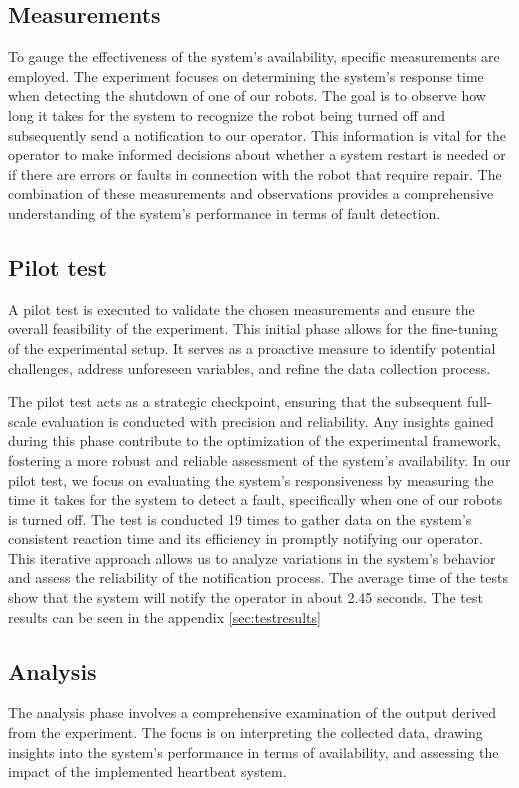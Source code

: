\subsection{Measurements}
\label{sec:measurements}
To gauge the effectiveness of the system's availability, specific measurements are employed. The experiment focuses on determining the system's response time when detecting the shutdown of one of our robots. The goal is to observe how long it takes for the system to recognize the robot being turned off and subsequently send a notification to our operator. This information is vital for the operator to make informed decisions about whether a system restart is needed or if there are errors or faults in connection with the robot that require repair. The combination of these measurements and observations provides a comprehensive understanding of the system's performance in terms of fault detection. 


\subsection{Pilot test}
\label{sec:pilot_test}
A pilot test\cite{Pilot} is executed to validate the chosen measurements and ensure the overall feasibility of the experiment. This initial phase allows for the fine-tuning of the experimental setup. It serves as a proactive measure to identify potential challenges, address unforeseen variables, and refine the data collection process.

The pilot test acts as a strategic checkpoint, ensuring that the subsequent full-scale evaluation is conducted with precision and reliability. Any insights gained during this phase contribute to the optimization of the experimental framework, fostering a more robust and reliable assessment of the system's availability.
In our pilot test, we focus on evaluating the system's responsiveness by measuring the time it takes for the system to detect a fault, specifically when one of our robots is turned off. The test is conducted 19 times to gather data on the system's consistent reaction time and its efficiency in promptly notifying our operator. This iterative approach allows us to analyze variations in the system's behavior and assess the reliability of the notification process. 
The average time of the tests show that the system will notify the operator in about 2.45 seconds. The test results can be seen in the appendix \ref{sec:testresults}

\subsection{Analysis}
\label{sec:analysis}
The analysis phase involves a comprehensive examination of the output derived from the experiment. The focus is on interpreting the collected data, drawing insights into the system's performance in terms of availability, and assessing the impact of the implemented heartbeat system.

